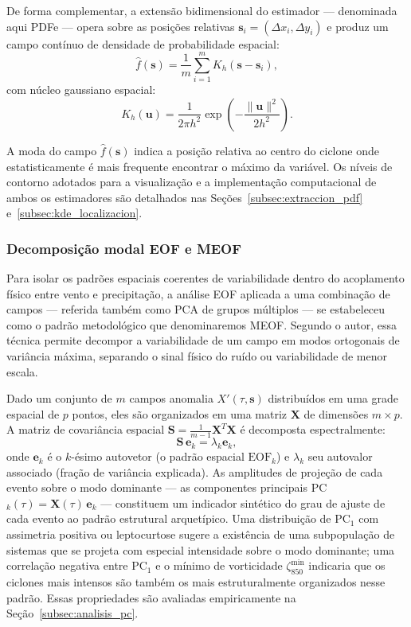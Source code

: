 De forma complementar, a extensão bidimensional do estimador — denominada aqui PDFe — opera sobre as posições relativas $\mathbf{s}_i = (\Delta x_i, \Delta y_i)$ e produz um campo contínuo de densidade de probabilidade espacial:
\begin{equation}\label{eq:tb_kde_simple}
\hat{f}(\mathbf{s}) = \frac{1}{m} \sum_{i=1}^{m} K_h(\mathbf{s} - \mathbf{s}_i),
\end{equation}
com núcleo gaussiano espacial:
\begin{equation}\label{eq:tb_gauss_kernel_2d_simple}
K_h(\mathbf{u}) = \frac{1}{2\pi h^2} \exp\!\left(-\frac{\|\mathbf{u}\|^2}{2h^2}\right).
\end{equation}

A moda do campo $\hat{f}(\mathbf{s})$ indica a posição relativa ao centro do ciclone onde estatisticamente é mais frequente encontrar o máximo da variável.
Os níveis de contorno adotados para a visualização e a implementação computacional de ambos os estimadores são detalhados nas Seções~\ref{subsec:extraccion_pdf} e~\ref{subsec:kde_localizacion}.

\subsubsection{Decomposição modal EOF e MEOF}\label{subsubsec:tb_eof}
Para isolar os padrões espaciais coerentes de variabilidade dentro do acoplamento físico entre vento e precipitação, a análise EOF aplicada a uma combinação de campos — referida também como PCA de grupos múltiplos \citep{hannachi2007empirical} — se estabeleceu como o padrão metodológico que denominaremos MEOF.
Segundo o autor, essa técnica permite decompor a variabilidade de um campo em modos ortogonais de variância máxima, separando o sinal físico do ruído ou variabilidade de menor escala.

Dado um conjunto de $m$ campos anomalia $X'(\tau, \mathbf{s})$ distribuídos em uma grade espacial de $p$ pontos, eles são organizados em uma matriz $\mathbf{X}$ de dimensões $m \times p$. A matriz de covariância espacial $\mathbf{S} = \frac{1}{m-1}\mathbf{X}^T\mathbf{X}$ é decomposta espectralmente:
\begin{equation}\label{eq:eof_decomp}
\mathbf{S}\,\mathbf{e}_k = \lambda_k \mathbf{e}_k,
\end{equation}
onde $\mathbf{e}_k$ é o $k$-ésimo autovetor (o padrão espacial $\text{EOF}_k$) e $\lambda_k$ seu autovalor associado (fração de variância explicada).
As amplitudes de projeção de cada evento sobre o modo dominante — as componentes principais PC$_k(\tau) = \mathbf{X}(\tau)\,\mathbf{e}_k$ — constituem um indicador sintético do grau de ajuste de cada evento ao padrão estrutural arquetípico.
Uma distribuição de PC$_1$ com assimetria positiva ou leptocurtose sugere a existência de uma subpopulação de sistemas que se projeta com especial intensidade sobre o modo dominante; uma correlação negativa entre PC$_1$ e o mínimo de vorticidade $\zeta_{850}^{\min}$ indicaria que os ciclones mais intensos são também os mais estruturalmente organizados nesse padrão.
Essas propriedades são avaliadas empiricamente na Seção~\ref{subsec:analisis_pc}.


